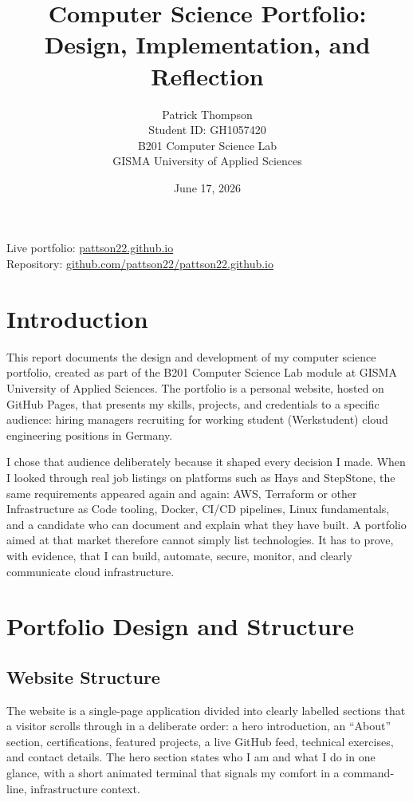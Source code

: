 \documentclass[11pt,a4paper]{article}
\title{\textbf{Computer Science Portfolio: Design, Implementation, and Reflection}}
\author{Patrick Thompson \\ Student ID: GH1057420 \\ B201 Computer Science Lab \\ GISMA University of Applied Sciences}
\date{June 17, 2026}
\begin{document}
\maketitle
\begin{center}
  \small
  Live portfolio: \href{https://pattson22.github.io}{pattson22.github.io} \\
  Repository: \href{https://github.com/pattson22/pattson22.github.io}{github.com/pattson22/pattson22.github.io}
\end{center}

\tableofcontents
\bigskip




\section{Introduction}
This report documents the design and development of my computer science portfolio, created as part of the B201 Computer Science Lab module at GISMA University of Applied Sciences. The portfolio is a personal website, hosted on GitHub Pages, that presents my skills, projects, and credentials to a specific audience: hiring managers recruiting for working student (Werkstudent) cloud engineering positions in Germany.

I chose that audience deliberately because it shaped every decision I made. When I looked through real job listings on platforms such as Hays and StepStone, the same requirements appeared again and again: AWS, Terraform or other Infrastructure as Code tooling, Docker, CI/CD pipelines, Linux fundamentals, and a candidate who can document and explain what they have built. A portfolio aimed at that market therefore cannot simply list technologies. It has to prove, with evidence, that I can build, automate, secure, monitor, and clearly communicate cloud infrastructure.

\section{Portfolio Design and Structure}

\subsection{Website Structure}
The website is a single-page application divided into clearly labelled sections that a visitor scrolls through in a deliberate order: a hero introduction, an ``About'' section, certifications, featured projects, a live GitHub feed, technical exercises, and contact details. The hero section states who I am and what I do in one glance, with a short animated terminal that signals my comfort in a command-line, infrastructure context.
\end{document}
